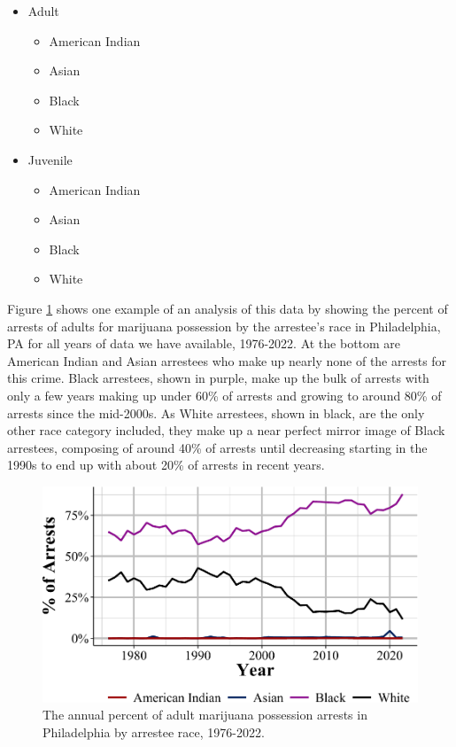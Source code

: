 \documentclass[
  12pt,
  openany]{book}
\providecommand{\tightlist}{%
  \setlength{\itemsep}{0pt}\setlength{\parskip}{0pt}}
\begin{document}
\begin{itemize}
\tightlist
\item
  Adult

  \begin{itemize}
  \tightlist
  \item
    American Indian
  \item
    Asian
  \item
    Black
  \item
    White
  \end{itemize}
\item
  Juvenile

  \begin{itemize}
  \tightlist
  \item
    American Indian
  \item
    Asian
  \item
    Black
  \item
    White
  \end{itemize}
\end{itemize}

Figure \ref{fig:phillyMarijuanaRacePercent} shows one example of an analysis of this data by showing the percent of arrests of adults for marijuana possession by the arrestee's race in Philadelphia, PA for all years of data we have available, 1976-2022. At the bottom are American Indian and Asian arrestees who make up nearly none of the arrests for this crime. Black arrestees, shown in purple, make up the bulk of arrests with only a few years making up under 60\% of arrests and growing to around 80\% of arrests since the mid-2000s. As White arrestees, shown in black, are the only other race category included, they make up a near perfect mirror image of Black arrestees, composing of around 40\% of arrests until decreasing starting in the 1990s to end up with about 20\% of arrests in recent years.

\begin{figure}

{\centering \includegraphics[width=0.9\linewidth]{05_arrests_files/figure-latex/phillyMarijuanaRacePercent-1} 

}

\caption{The annual percent of adult marijuana possession arrests in Philadelphia by arrestee race, 1976-2022.}\label{fig:phillyMarijuanaRacePercent}
\end{figure}
\end{document}
